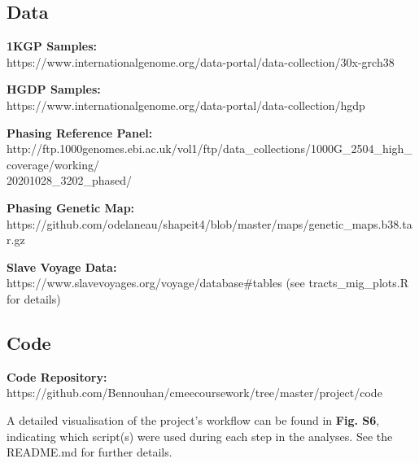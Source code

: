 \documentclass[11pt]{article}
\begin{document}
\subsection{Data}

\textbf{1KGP Samples:} \\
https://www.internationalgenome.org/data-portal/data-collection/30x-grch38
\vspace{3mm}

\noindent
\textbf{HGDP Samples:} \\
https://www.internationalgenome.org/data-portal/data-collection/hgdp
\vspace{3mm}

\noindent
\textbf{Phasing Reference Panel:} \\
http://ftp.1000genomes.ebi.ac.uk/vol1/ftp/data\_collections/1000G\_2504\_high\_coverage/working/\\20201028\_3202\_phased/
\vspace{3mm}

\noindent
\textbf{Phasing Genetic Map:} \\
https://github.com/odelaneau/shapeit4/blob/master/maps/genetic\_maps.b38.tar.gz
\vspace{3mm}

\noindent
\textbf{Slave Voyage Data:} \\
https://www.slavevoyages.org/voyage/database\#tables (see tracts\_mig\_plots.R for details)


\vspace{.4cm}
\subsection{Code}

\textbf{Code Repository:} \\
https://github.com/Bennouhan/cmeecoursework/tree/master/project/code


\vspace{4mm}

\noindent
A detailed visualisation of the project's workflow can be found in \textbf{Fig. S6}, indicating which script(s) were used during each step in the analyses. See the README.md for further details.


\newpage
\printbibliography[heading=bibintoc]










\newpage
\end{document}
